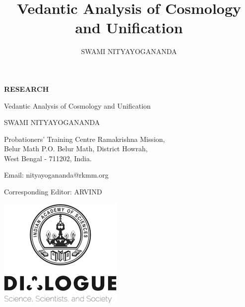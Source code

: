 \documentclass[twoside, 13pt]{article}
\title{{ Vedantic Analysis of Cosmology and Unification}}
\author{{{\fontsize{14}{16}\selectfont SWAMI NITYAYOGANANDA}}}
\date{}
\begin{document}
  


\begin{titlepage}
   \begin{center}
   {\fontsize{14}{16}\selectfont
   {\large\textbf{RESEARCH}}}
   
       \vspace*{1cm}
      {\fontsize{24}{26}\selectfont
       {\LARGE Vedantic Analysis of Cosmology and Unification}
}
       \vspace{0.7cm}      
            
{\fontsize{14}{16}\selectfont
       {\large SWAMI NITYAYOGANANDA}}

       \vspace{0.5cm}
       {\fontsize{14}{16}\selectfont      
      Probationers’ Training Centre Ramakrishna Mission,\\ Belur Math P.O. Belur Math, District Howrah,\\ West Bengal - 711202, India.
       
       \vspace{0.5cm}
       
       \begin{center}
		Email: nityayogananda@rkmm.org  
		\end{center}
       


\vspace{.3cm}

Corresponding Editor: ARVIND


}
     
     
     \vfill
       \includegraphics{images/logo.jpg}
           
            
            
   \end{center}
\end{titlepage}
\end{document}
